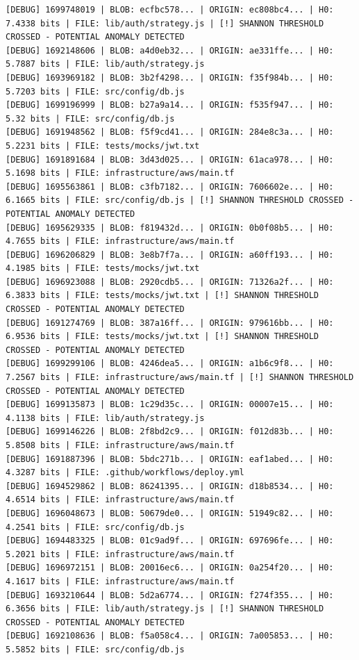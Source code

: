 \documentclass[12pt, a4paper, oneside]{report}
\begin{document}
\begin{lstlisting}[basicstyle=\tiny\ttfamily]
[DEBUG] 1699748019 | BLOB: ecfbc578... | ORIGIN: ec808bc4... | H0: 7.4338 bits | FILE: lib/auth/strategy.js | [!] SHANNON THRESHOLD CROSSED - POTENTIAL ANOMALY DETECTED
[DEBUG] 1692148606 | BLOB: a4d0eb32... | ORIGIN: ae331ffe... | H0: 5.7887 bits | FILE: lib/auth/strategy.js
[DEBUG] 1693969182 | BLOB: 3b2f4298... | ORIGIN: f35f984b... | H0: 5.7203 bits | FILE: src/config/db.js
[DEBUG] 1699196999 | BLOB: b27a9a14... | ORIGIN: f535f947... | H0: 5.32 bits | FILE: src/config/db.js
[DEBUG] 1691948562 | BLOB: f5f9cd41... | ORIGIN: 284e8c3a... | H0: 5.2231 bits | FILE: tests/mocks/jwt.txt
[DEBUG] 1691891684 | BLOB: 3d43d025... | ORIGIN: 61aca978... | H0: 5.1698 bits | FILE: infrastructure/aws/main.tf
[DEBUG] 1695563861 | BLOB: c3fb7182... | ORIGIN: 7606602e... | H0: 6.1665 bits | FILE: src/config/db.js | [!] SHANNON THRESHOLD CROSSED - POTENTIAL ANOMALY DETECTED
[DEBUG] 1695629335 | BLOB: f819432d... | ORIGIN: 0b0f08b5... | H0: 4.7655 bits | FILE: infrastructure/aws/main.tf
[DEBUG] 1696206829 | BLOB: 3e8b7f7a... | ORIGIN: a60ff193... | H0: 4.1985 bits | FILE: tests/mocks/jwt.txt
[DEBUG] 1696923088 | BLOB: 2920cdb5... | ORIGIN: 71326a2f... | H0: 6.3833 bits | FILE: tests/mocks/jwt.txt | [!] SHANNON THRESHOLD CROSSED - POTENTIAL ANOMALY DETECTED
[DEBUG] 1691274769 | BLOB: 387a16ff... | ORIGIN: 979616bb... | H0: 6.9536 bits | FILE: tests/mocks/jwt.txt | [!] SHANNON THRESHOLD CROSSED - POTENTIAL ANOMALY DETECTED
[DEBUG] 1699299106 | BLOB: 4246dea5... | ORIGIN: a1b6c9f8... | H0: 7.2567 bits | FILE: infrastructure/aws/main.tf | [!] SHANNON THRESHOLD CROSSED - POTENTIAL ANOMALY DETECTED
[DEBUG] 1699135873 | BLOB: 1c29d35c... | ORIGIN: 00007e15... | H0: 4.1138 bits | FILE: lib/auth/strategy.js
[DEBUG] 1699146226 | BLOB: 2f8bd2c9... | ORIGIN: f012d83b... | H0: 5.8508 bits | FILE: infrastructure/aws/main.tf
[DEBUG] 1691887396 | BLOB: 5bdc271b... | ORIGIN: eaf1abed... | H0: 4.3287 bits | FILE: .github/workflows/deploy.yml
[DEBUG] 1694529862 | BLOB: 86241395... | ORIGIN: d18b8534... | H0: 4.6514 bits | FILE: infrastructure/aws/main.tf
[DEBUG] 1696048673 | BLOB: 50679de0... | ORIGIN: 51949c82... | H0: 4.2541 bits | FILE: src/config/db.js
[DEBUG] 1694483325 | BLOB: 01c9ad9f... | ORIGIN: 697696fe... | H0: 5.2021 bits | FILE: infrastructure/aws/main.tf
[DEBUG] 1696972151 | BLOB: 20016ec6... | ORIGIN: 0a254f20... | H0: 4.1617 bits | FILE: infrastructure/aws/main.tf
[DEBUG] 1693210644 | BLOB: 5d2a6774... | ORIGIN: f274f355... | H0: 6.3656 bits | FILE: lib/auth/strategy.js | [!] SHANNON THRESHOLD CROSSED - POTENTIAL ANOMALY DETECTED
[DEBUG] 1692108636 | BLOB: f5a058c4... | ORIGIN: 7a005853... | H0: 5.5852 bits | FILE: src/config/db.js

\end{lstlisting}
\end{document}
